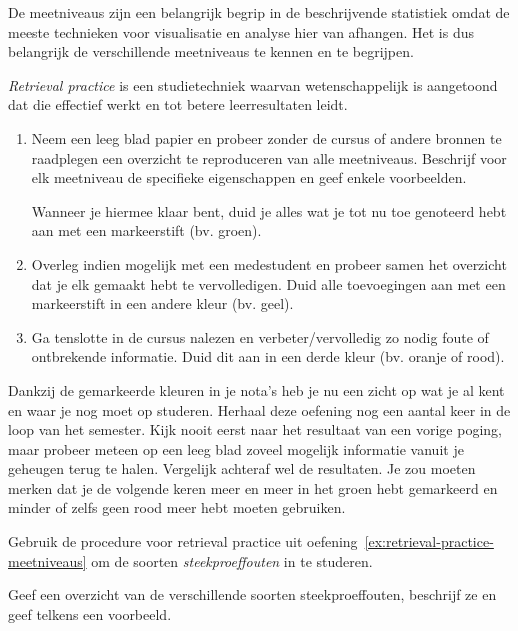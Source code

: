 \begin{exercise}
  \label{ex:retrieval-practice-meetniveaus}
  De meetniveaus zijn een belangrijk begrip in de beschrijvende statistiek omdat de meeste technieken voor visualisatie en analyse hier van afhangen. Het is dus belangrijk de verschillende meetniveaus te kennen en te begrijpen.
  
  \emph{Retrieval practice} is een studietechniek waarvan wetenschappelijk is aangetoond dat die effectief werkt en tot betere leerresultaten leidt.
  
  \begin{enumerate}[label=\alph*.]
    \item Neem een leeg blad papier en probeer zonder de cursus of andere bronnen te raadplegen een overzicht te reproduceren van alle meetniveaus. Beschrijf voor elk meetniveau de specifieke eigenschappen en geef enkele voorbeelden.
    
    Wanneer je hiermee klaar bent, duid je alles wat je tot nu toe genoteerd hebt aan met een markeerstift (bv. groen).
    
    \item Overleg indien mogelijk met een medestudent en probeer samen het overzicht dat je elk gemaakt hebt te vervolledigen. Duid alle toevoegingen aan met een markeerstift in een andere kleur (bv. geel).
    
    \item Ga tenslotte in de cursus nalezen en verbeter/vervolledig zo nodig foute of ontbrekende informatie. Duid dit aan in een derde kleur (bv. oranje of rood).
  \end{enumerate}

  Dankzij de gemarkeerde kleuren in je nota's heb je nu een zicht op wat je al kent en waar je nog moet op studeren. Herhaal deze oefening nog een aantal keer in de loop van het semester. Kijk nooit eerst naar het resultaat van een vorige poging, maar probeer meteen op een leeg blad zoveel mogelijk informatie vanuit je geheugen terug te halen. Vergelijk achteraf wel de resultaten. Je zou moeten merken dat je de volgende keren meer en meer in het groen hebt gemarkeerd en minder of zelfs geen rood meer hebt moeten gebruiken.
\end{exercise}

\begin{exercise}
  Gebruik de procedure voor retrieval practice uit oefening~\ref{ex:retrieval-practice-meetniveaus} om de soorten \emph{steekproeffouten} in te studeren.
  
  Geef een overzicht van de verschillende soorten steekproeffouten, beschrijf ze en geef telkens een voorbeeld.
\end{exercise}